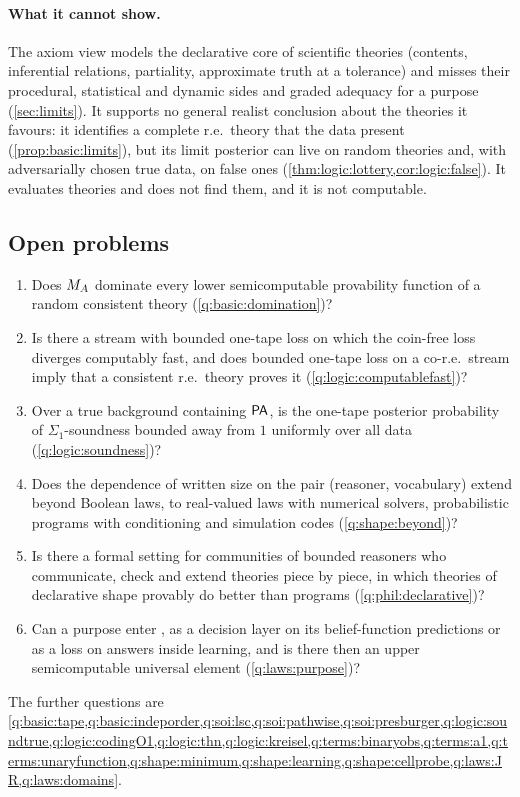 \paragraph{What it cannot show.} The axiom view models the declarative core of scientific theories (contents, inferential relations, partiality, approximate truth at a tolerance) and misses their procedural, statistical and dynamic sides and graded adequacy for a purpose (\cref{sec:limits}). It supports no general realist conclusion about the theories it favours: it identifies a complete r.e.\ theory that the data present (\cref{prop:basic:limits}), but its limit posterior can live on random theories and, with adversarially chosen true data, on false ones (\cref{thm:logic:lottery,cor:logic:false}). It evaluates theories and does not find them, and it is not computable.

\subsection{Open problems}\label{sec:discussion:open}

\begin{enumerate}[leftmargin=*,label=(\arabic*)]
\item Does $M_{A}$ dominate every lower semicomputable provability function of a random consistent theory (\cref{q:basic:domination})?
\item Is there a stream with bounded one-tape loss on which the coin-free loss diverges computably fast, and does bounded one-tape loss on a co-r.e.\ stream imply that a consistent r.e.\ theory proves it (\cref{q:logic:computablefast})?
\item Over a true background containing $\mathsf{PA}$, is the one-tape posterior probability of $\Sigma_1$-soundness bounded away from $1$ uniformly over all data (\cref{q:logic:soundness})?
\item Does the dependence of written size on the pair (reasoner, vocabulary) extend beyond Boolean laws, to real-valued laws with numerical solvers, probabilistic programs with conditioning and simulation codes (\cref{q:shape:beyond})?
\item Is there a formal setting for communities of bounded reasoners who communicate, check and extend theories piece by piece, in which theories of declarative shape provably do better than programs (\cref{q:phil:declarative})?
\item Can a purpose enter \SAIabbr, as a decision layer on its belief-function predictions or as a loss on answers inside learning, and is there then an upper semicomputable universal element (\cref{q:laws:purpose})?
\end{enumerate}
The further questions are \cref{q:basic:tape,q:basic:indeporder,q:soi:lsc,q:soi:pathwise,q:soi:presburger,q:logic:soundtrue,q:logic:codingO1,q:logic:thn,q:logic:kreisel,q:terms:binaryobs,q:terms:a1,q:terms:unaryfunction,q:shape:minimum,q:shape:learning,q:shape:cellprobe,q:laws:JR,q:laws:domains}.

